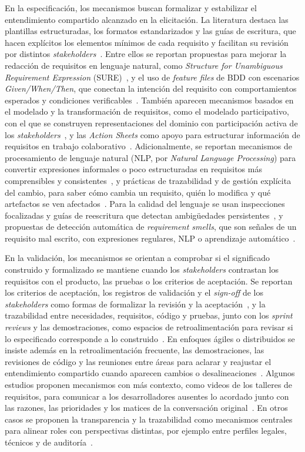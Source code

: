 \documentclass[12pt,letterpaper,oneside]{report}
\begin{document}
En la especificación, los mecanismos buscan formalizar y estabilizar el
entendimiento compartido alcanzado en la elicitación. La literatura destaca las plantillas
estructuradas, los formatos estandarizados y las guías de escritura, que hacen
explícitos los elementos mínimos de cada requisito y facilitan su revisión por
distintos \textit{stakeholders}~\cite{balasubramaniam2023}. Entre ellos se
reportan propuestas para mejorar la redacción de requisitos en lenguaje
natural, como \textit{Structure for Unambiguous Requirement Expression}
(SURE)~\cite{parrales2024}, y el uso de \textit{feature files} de BDD con
escenarios \textit{Given/When/Then}, que conectan la intención del requisito con
comportamientos esperados y condiciones verificables~\cite{irshad2021bdd}.
También aparecen mecanismos basados en el modelado y la transformación de
requisitos, como el modelado participativo, con el que se construyen
representaciones del dominio con participación activa de los
\textit{stakeholders}~\cite{devries2023}, y las \textit{Action Sheets} como
apoyo para estructurar información de requisitos en trabajo
colaborativo~\cite{kunz2016}. Adicionalmente, se reportan mecanismos de procesamiento de lenguaje natural
(NLP, por \textit{Natural Language Processing}) para convertir expresiones
informales o poco estructuradas en requisitos más comprensibles y
consistentes~\cite{ali2019}, y prácticas de trazabilidad y de gestión explícita
del cambio, para saber cómo cambia un requisito, quién lo modifica y qué
artefactos se ven afectados~\cite{behutiye2022quality}. Para la calidad del
lenguaje se usan inspecciones focalizadas y guías de reescritura que detectan
ambigüedades persistentes~\cite{ribeiro2020}, y propuestas de detección
automática de \textit{requirement smells}, que son señales de un requisito mal
escrito, con expresiones regulares, NLP o aprendizaje
automático~\cite{gentili2025}.

En la validación, los mecanismos se orientan a comprobar si el significado
construido y formalizado se mantiene cuando los \textit{stakeholders} contrastan
los requisitos con el producto, las pruebas o los criterios de aceptación. Se
reportan los criterios de aceptación, los registros de validación y el
\textit{sign-off} de los \textit{stakeholders} como formas de formalizar la
revisión y la aceptación~\cite{laporte2023}, y la trazabilidad entre
necesidades, requisitos, código y pruebas, junto con los \textit{sprint
reviews} y las demostraciones, como espacios de retroalimentación para revisar
si lo especificado corresponde a lo construido~\cite{pacheco2022}. En enfoques
ágiles o distribuidos se insiste además en la retroalimentación frecuente, las
demostraciones, las revisiones de código y las reuniones entre áreas para
aclarar y reajustar el entendimiento compartido cuando aparecen cambios o
desalineaciones~\cite{okpara2023}. Algunos estudios proponen mecanismos con más
contexto, como videos de los talleres de requisitos, para comunicar a los
desarrolladores ausentes lo acordado junto con las razones, las
prioridades y los matices de la conversación original~\cite{fricker2015}. En
otros casos se proponen la transparencia y la trazabilidad como mecanismos
centrales para alinear roles con perspectivas distintas, por ejemplo entre
perfiles legales, técnicos y de auditoría~\cite{kosenkov2026}.
\end{document}
